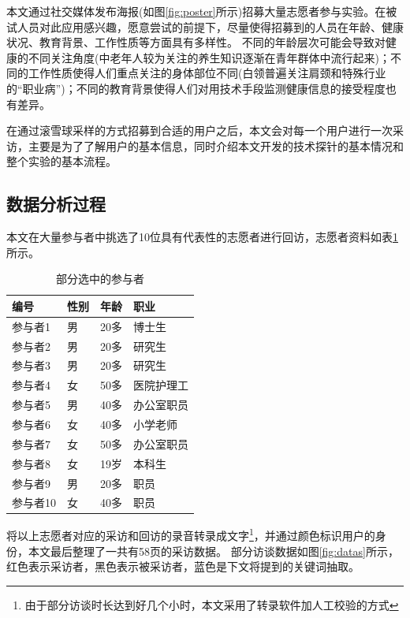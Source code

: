 本文通过社交媒体发布海报(如图\ref{fig:poster}所示)招募大量志愿者参与实验。在被试人员对此应用感兴趣，愿意尝试的前提下，尽量使得招募到的人员在年龄、健康状况、教育背景、工作性质等方面具有多样性。
不同的年龄层次可能会导致对健康的不同关注角度(中老年人较为关注的养生知识逐渐在青年群体中流行起来)；不同的工作性质使得人们重点关注的身体部位不同(白领普遍关注肩颈和特殊行业的“职业病”)；不同的教育背景使得人们对用技术手段监测健康信息的接受程度也有差异。

在通过滚雪球采样的方式招募到合适的用户之后，本文会对每一个用户进行一次采访，主要是为了了解用户的基本信息，同时介绍本文开发的技术探针的基本情况和整个实验的基本流程。


\subsection{数据分析过程}

本文在大量参与者中挑选了10位具有代表性的志愿者进行回访，志愿者资料如表\ref{tab:part}所示。
\begin{table}[htb]
    \centering
    \caption{部分选中的参与者}
    \begin{tabular}{llll}
          \toprule
          编号 &	性别 &	年龄 &	职业 \\
          \midrule
          参与者1 &	男 &	20多 &	博士生 \\
          参与者2 &	男 &	20多 &	研究生 \\
          参与者3 &	男 &	20多 &	研究生 \\
          参与者4 &	女 &	50多 &	医院护理工 \\
          参与者5 &	男 &	40多 &	办公室职员 \\
          参与者6 &	女 &	40多 &	小学老师 \\
          参与者7 &	女 &	50多 &	办公室职员 \\
          参与者8 &	女 &	19岁 &	本科生 \\
          参与者9 &	男 &	20多 &	职员 \\
          参与者10 &	女 &	40多 &	职员 \\
          \bottomrule
    \end{tabular}
    \label{tab:part}
\end{table}
将以上志愿者对应的采访和回访的录音转录成文字\footnote{由于部分访谈时长达到好几个小时，本文采用了转录软件加人工校验的方式}，并通过颜色标识用户的身份，本文最后整理了一共有58页的采访数据。
部分访谈数据如图\ref{fig:datas}所示，红色表示采访者，黑色表示被采访者，蓝色是下文将提到的关键词抽取。

